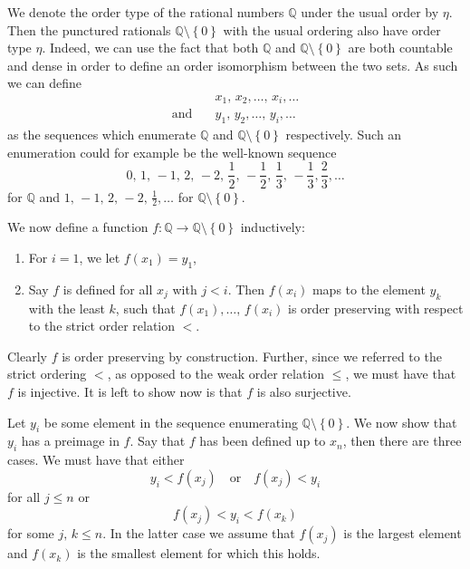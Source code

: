 \documentclass[../../main.tex]{subfiles}
\begin{document}
\begin{example}\cite[Exercise 2.3]{Ros82}
    We denote the order type of the rational numbers $\mathbb{Q}$ under the usual order by $\eta$.
    Then the punctured rationals $\mathbb{Q} \setminus \left\{0\right\}$ with the usual ordering also have order type $\eta$.
    Indeed, we can use the fact that both $\mathbb{Q}$ and $\mathbb{Q} \setminus \left\{0\right\}$ are both countable and dense in order to define an order isomorphism between the two sets.
    As such we can define 
    \begin{align*}
        & x_1,\, x_2,\ldots,\, x_i,\ldots \\
        \text{and} \quad & y_1,\, y_2,\ldots,\, y_i,\ldots
    \end{align*}
    as the sequences which enumerate $\mathbb{Q}$ and $\mathbb{Q} \setminus \left\{0\right\}$ respectively.
    Such an enumeration could for example be the well-known sequence 
    $$0,\, 1,\, -1,\, 2,\, -2,\, \frac{1}{2},\, -\frac{1}{2},\, \frac{1}{3},\, -\frac{1}{3}, \frac{2}{3},\ldots$$
    for $\mathbb{Q}$ and $1,\, -1,\, 2,\, -2,\, \frac{1}{2},\ldots$ for $\mathbb{Q} \setminus \left\{0\right\}$.

    We now define a function $f: \mathbb{Q} \to \mathbb{Q} \setminus \left\{0\right\}$ inductively:
    \begin{enumerate}
        \item For $i=1$, we let $f(x_1) = y_1$,
        \item Say $f$ is defined for all $x_j$ with $j < i$.
        Then $f(x_i)$ maps to the element $y_k$ with the least $k$,
        such that $f(x_1),\ldots,\, f(x_i)$ is order preserving with respect to the strict order relation $<$.
    \end{enumerate}
    Clearly $f$ is order preserving by construction.
    Further, since we referred to the strict ordering $<$, as opposed to the weak order relation $\leq$,
    we must have that $f$ is injective.
    It is left to show now is that $f$ is also surjective.

    Let $y_i$ be some element in the sequence enumerating $\mathbb{Q} \setminus \left\{0\right\}$.
    We now show that $y_i$ has a preimage in $f$.
    Say that $f$ has been defined up to $x_n$, then there are three cases.
    We must have that either $$y_i < f(x_j)\quad \text{or} \quad f(x_j) < y_i$$ for all $j \leq n$ or $$f(x_j) < y_i < f(x_k)$$ for some $j,\, k \leq n$.
    In the latter case we assume that $f(x_j)$ is the largest element and $f(x_k)$ is the smallest element for which this holds.


\end{example}
\end{document}

